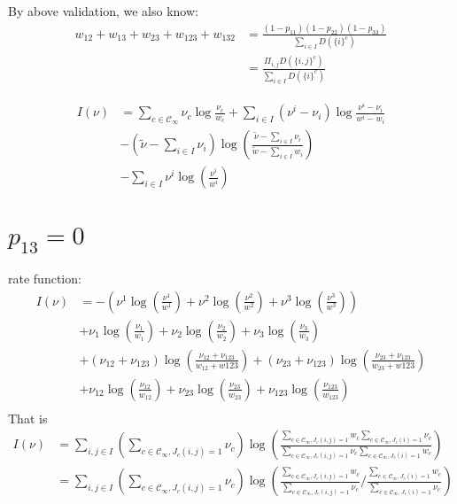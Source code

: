\documentclass[a4paper,11pt]{article}
\begin{document}
By above validation, we also know:
\begin{align*}
    w_{12}+w_{13}+w_{23}+w_{123}+w_{132} &= \frac{(1-p_{11})(1-p_{22})(1-p_{33})}{\sum_{i\in I} D(\{i\}^c)} \\
    &= \frac{\Pi_{i, j} D(\{i, j\}^c)}{\sum_{i\in I} D(\{i\}^c)}
\end{align*}

\begin{align*}
    I(\nu) &= \sum_{c \in \mathcal{C}_{\infty}} \nu_{c} \log \frac{\nu_{c}}{w_c} + \sum_{i\in I}(\nu^i - \nu_i)\log \frac{\nu^i - \nu_i}{w^i - w_i} \\
    &-(\tilde{\nu} - \sum_{i\in I}\nu_i)\log(\frac{\tilde{\nu} - \sum_{i\in I}\nu_i}{\tilde{w} - \sum_{i\in I}w_i}) \\
    &-\sum_{i\in I} \nu^i \log (\frac{\nu^i}{w^i})
\end{align*}

\section{$p_{13}=0$}
rate function:
\begin{align*}
    I(\nu)
    &= -(\nu^{1} \log (\frac{\nu^{1}}{w^{1}}) + \nu^{2} \log (\frac{\nu^{2}}{w^{2}}) + \nu^{3} \log (\frac{\nu^{3}}{w^{3}})) \\
    &+ \nu_{1} \log (\frac{\nu_{1}}{w_{1}}) + \nu_{2} \log (\frac{\nu_{2}}{w_{2}}) + \nu_{3} \log (\frac{\nu_{3}}{w_{3}}) \\
    &+ (\nu_{12}+\nu_{123}) \log(\frac{\nu_{12}+\nu_{123}}{w_{12}+w{123}}) +
    (\nu_{23}+\nu_{123}) \log(\frac{\nu_{23}+\nu_{123}}{w_{23}+w{123}}) \\
    &+ \nu_{12} \log(\frac{\nu_{12}}{w_{12}}) + \nu_{23} \log(\frac{\nu_{23}}{w_{23}}) + \nu_{123} \log(\frac{\nu_{123}}{w_{123}}) \\
\end{align*}
That is
\begin{align*}
    I(\nu) &=  \sum_{i, j \in I} \left(\sum_{c \in \mathcal{C_{\infty}}, J_c(i, j)=1}
    \nu_c \right) \log(\frac{\sum_{c \in \mathcal{C_{\infty}}, J_c(i, j)=1} w_c \sum_{c \in \mathcal{C_{\infty}}, J_c(i)=1} \nu_c}{\sum_{c \in \mathcal{C_{\infty}}, J_c(i, j)=1} \nu_c \sum_{c \in \mathcal{C_{\infty}}, J_c(i)=1} w_c}) \\
    &= \sum_{i, j \in I} \left(\sum_{c \in \mathcal{C_{\infty}}, J_c(i, j)=1}
    \nu_c \right) \log(\frac{\sum_{c \in \mathcal{C_{\infty}}, J_c(i, j)=1} w_c }{\sum_{c \in \mathcal{C_{\infty}}, J_c(i, j)=1} \nu_c }
    /\frac{\sum_{c \in \mathcal{C_{\infty}}, J_c(i)=1} w_c}{\sum_{c \in \mathcal{C_{\infty}}, J_c(i)=1} \nu_c}) \\
\end{align*}
\end{document}
